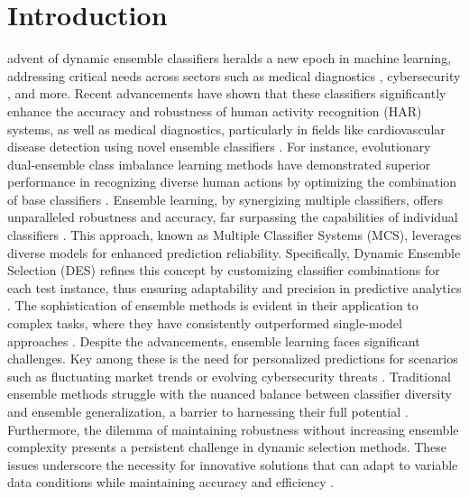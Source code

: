 \documentclass[lettersize,journal]{IEEEtran}
\begin{document}
	\section{Introduction}
	 advent of dynamic ensemble classifiers heralds a new epoch in machine learning, addressing critical needs across sectors such as medical diagnostics \cite{zimmerman_early_2019}, cybersecurity \cite{folino_ensemble_2016}, and more. Recent advancements have shown that these classifiers significantly enhance the accuracy and robustness of human activity recognition (HAR) systems, as well as medical diagnostics, particularly in fields like cardiovascular disease detection using novel ensemble classifiers \cite{hosseini_chagahi_cardiovascular_2024}. For instance, evolutionary dual-ensemble class imbalance learning methods have demonstrated superior performance in recognizing diverse human actions by optimizing the combination of base classifiers \cite{guo_evolutionary_2022}. Ensemble learning, by synergizing multiple classifiers, offers unparalleled robustness and accuracy, far surpassing the capabilities of individual classifiers \cite{xu_novel_2023, lv_classifier_2019, mao_end--end_2021, li_-network_2021, pari_multitier_2020}. 
	This approach, known as Multiple Classifier Systems (MCS), leverages diverse models for enhanced prediction reliability. Specifically, Dynamic Ensemble Selection (DES) refines this concept by customizing classifier combinations for each test instance, thus ensuring adaptability and precision in predictive analytics \cite{nguyen_ensemble_2020, zhang_distance-based_2019}. The sophistication of ensemble methods is evident in their application to complex tasks, where they have consistently outperformed single-model approaches \cite{zhao_experimental_2021, choi_ddes_2021}. Despite the advancements, ensemble learning faces significant challenges. Key among these is the need for personalized predictions for scenarios such as fluctuating market trends or evolving cybersecurity threats \cite{ditzler_learning_2015}. 
	Traditional ensemble methods struggle with the nuanced balance between classifier diversity and ensemble generalization, a barrier to harnessing their full potential \cite{lessmann_benchmarking_2015}. Furthermore, the dilemma of maintaining robustness without increasing ensemble complexity presents a persistent challenge in dynamic selection methods. These issues underscore the necessity for innovative solutions that can adapt to variable data conditions while maintaining accuracy and efficiency \cite{ditzler_learning_2015}.
	
\end{document}
